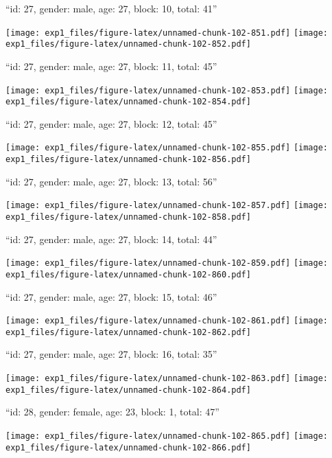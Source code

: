 \documentclass[11pt,,]{article}
\begin{document}
\newpage
[1] 

``id: 27, gender: male, age: 27, block: 10, total: 41''

\texttt{[image: exp1\_files/figure-latex/unnamed-chunk-102-851.pdf]}
\texttt{[image: exp1\_files/figure-latex/unnamed-chunk-102-852.pdf]}

\newpage
[1] 

``id: 27, gender: male, age: 27, block: 11, total: 45''

\texttt{[image: exp1\_files/figure-latex/unnamed-chunk-102-853.pdf]}
\texttt{[image: exp1\_files/figure-latex/unnamed-chunk-102-854.pdf]}

\newpage
[1] 

``id: 27, gender: male, age: 27, block: 12, total: 45''

\texttt{[image: exp1\_files/figure-latex/unnamed-chunk-102-855.pdf]}
\texttt{[image: exp1\_files/figure-latex/unnamed-chunk-102-856.pdf]}

\newpage
[1] 

``id: 27, gender: male, age: 27, block: 13, total: 56''

\texttt{[image: exp1\_files/figure-latex/unnamed-chunk-102-857.pdf]}
\texttt{[image: exp1\_files/figure-latex/unnamed-chunk-102-858.pdf]}

\newpage
[1] 

``id: 27, gender: male, age: 27, block: 14, total: 44''

\texttt{[image: exp1\_files/figure-latex/unnamed-chunk-102-859.pdf]}
\texttt{[image: exp1\_files/figure-latex/unnamed-chunk-102-860.pdf]}

\newpage
[1] 

``id: 27, gender: male, age: 27, block: 15, total: 46''

\texttt{[image: exp1\_files/figure-latex/unnamed-chunk-102-861.pdf]}
\texttt{[image: exp1\_files/figure-latex/unnamed-chunk-102-862.pdf]}

\newpage
[1] 

``id: 27, gender: male, age: 27, block: 16, total: 35''

\texttt{[image: exp1\_files/figure-latex/unnamed-chunk-102-863.pdf]}
\texttt{[image: exp1\_files/figure-latex/unnamed-chunk-102-864.pdf]}

\newpage
[1] 

``id: 28, gender: female, age: 23, block: 1, total: 47''

\texttt{[image: exp1\_files/figure-latex/unnamed-chunk-102-865.pdf]}
\texttt{[image: exp1\_files/figure-latex/unnamed-chunk-102-866.pdf]}
\end{document}
